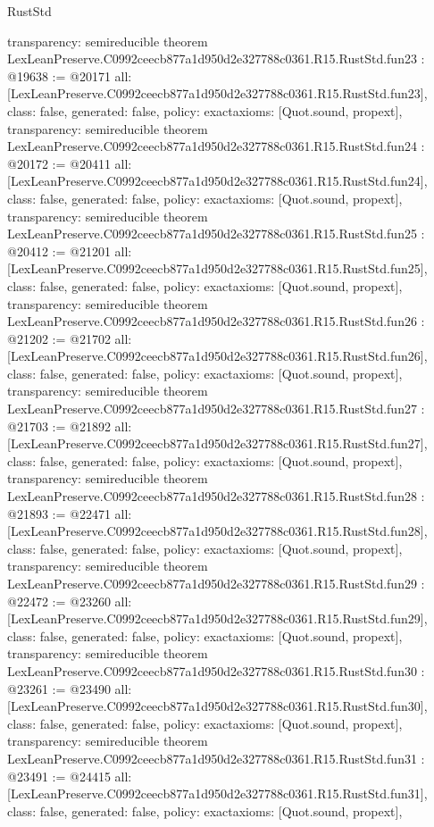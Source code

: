 \begin{lexlean}{RustStd}
\begin{coremodule}
{  transparency: semireducible
}
theorem LexLeanPreserve.C0992ceecb877a1d950d2e327788c0361.R15.RustStd.fun23 : @19638 := @20171 {
  all: [LexLeanPreserve.C0992ceecb877a1d950d2e327788c0361.R15.RustStd.fun23],
  class: false,
  generated: false,
  policy: exact{axioms: [Quot.sound, propext]},
  transparency: semireducible
}
theorem LexLeanPreserve.C0992ceecb877a1d950d2e327788c0361.R15.RustStd.fun24 : @20172 := @20411 {
  all: [LexLeanPreserve.C0992ceecb877a1d950d2e327788c0361.R15.RustStd.fun24],
  class: false,
  generated: false,
  policy: exact{axioms: [Quot.sound, propext]},
  transparency: semireducible
}
theorem LexLeanPreserve.C0992ceecb877a1d950d2e327788c0361.R15.RustStd.fun25 : @20412 := @21201 {
  all: [LexLeanPreserve.C0992ceecb877a1d950d2e327788c0361.R15.RustStd.fun25],
  class: false,
  generated: false,
  policy: exact{axioms: [Quot.sound, propext]},
  transparency: semireducible
}
theorem LexLeanPreserve.C0992ceecb877a1d950d2e327788c0361.R15.RustStd.fun26 : @21202 := @21702 {
  all: [LexLeanPreserve.C0992ceecb877a1d950d2e327788c0361.R15.RustStd.fun26],
  class: false,
  generated: false,
  policy: exact{axioms: [Quot.sound, propext]},
  transparency: semireducible
}
theorem LexLeanPreserve.C0992ceecb877a1d950d2e327788c0361.R15.RustStd.fun27 : @21703 := @21892 {
  all: [LexLeanPreserve.C0992ceecb877a1d950d2e327788c0361.R15.RustStd.fun27],
  class: false,
  generated: false,
  policy: exact{axioms: [Quot.sound, propext]},
  transparency: semireducible
}
theorem LexLeanPreserve.C0992ceecb877a1d950d2e327788c0361.R15.RustStd.fun28 : @21893 := @22471 {
  all: [LexLeanPreserve.C0992ceecb877a1d950d2e327788c0361.R15.RustStd.fun28],
  class: false,
  generated: false,
  policy: exact{axioms: [Quot.sound, propext]},
  transparency: semireducible
}
theorem LexLeanPreserve.C0992ceecb877a1d950d2e327788c0361.R15.RustStd.fun29 : @22472 := @23260 {
  all: [LexLeanPreserve.C0992ceecb877a1d950d2e327788c0361.R15.RustStd.fun29],
  class: false,
  generated: false,
  policy: exact{axioms: [Quot.sound, propext]},
  transparency: semireducible
}
theorem LexLeanPreserve.C0992ceecb877a1d950d2e327788c0361.R15.RustStd.fun30 : @23261 := @23490 {
  all: [LexLeanPreserve.C0992ceecb877a1d950d2e327788c0361.R15.RustStd.fun30],
  class: false,
  generated: false,
  policy: exact{axioms: [Quot.sound, propext]},
  transparency: semireducible
}
theorem LexLeanPreserve.C0992ceecb877a1d950d2e327788c0361.R15.RustStd.fun31 : @23491 := @24415 {
  all: [LexLeanPreserve.C0992ceecb877a1d950d2e327788c0361.R15.RustStd.fun31],
  class: false,
  generated: false,
  policy: exact{axioms: [Quot.sound, propext]},
}
\end{coremodule}
\end{lexlean}
